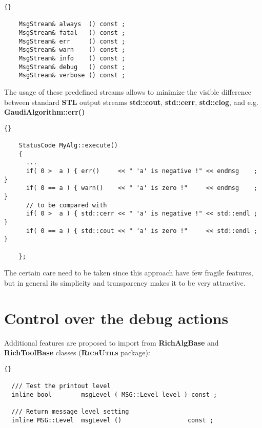 \documentclass{lhcbnote}
\newcommand{\bftt}         {\ttfamily\bfseries}
\newcommand{\scbf}         {\scshape\bfseries}
\begin{document}
\begin{scriptsize}
  \begin{lstlisting}{}

    MsgStream& always  () const ;
    MsgStream& fatal   () const ;
    MsgStream& err     () const ;
    MsgStream& warn    () const ;
    MsgStream& info    () const ;
    MsgStream& debug   () const ;
    MsgStream& verbose () const ;

  \end{lstlisting}
\end{scriptsize}

The usage of these predefined streams 
allows to minimize the visible difference between 
standard {\scbf{STL}} output streams 
{\bftt{std::cout}}, {\bftt{std::cerr}},
{\bftt{std::clog}}, and e.g. {\bftt{GaudiAlgorithm::err()}}

\begin{scriptsize}
 \begin{lstlisting}{}

    StatusCode MyAlg::execute() 
    {
      ...
      if( 0 >  a ) { err()     << " 'a' is negative !" << endmsg    ; }
      if( 0 == a ) { warn()    << " 'a' is zero !"     << endmsg    ; }
      // to be compared with 
      if( 0 >  a ) { std::cerr << " 'a' is negative !" << std::endl ; }
      if( 0 == a ) { std::cout << " 'a' is zero !"     << std::endl ; }

    };

 \end{lstlisting}
\end{scriptsize}

The certain care need to be taken since this approach have 
few fragile features, but in general its simplicity and 
transparency makes it to be very attractive. 

\section{Control over the debug actions}
Additional features are proposed to import from 
{\bftt{RichAlgBase}} and {\bftt{RichToolBase}} classes
({\scbf{RichUtils}} package): 

\begin{scriptsize}
 \begin{lstlisting}{}

  /// Test the printout level
  inline bool        msgLevel ( MSG::Level level ) const ;

  /// Return message level setting
  inline MSG::Level  msgLevel ()                  const ;

 \end{lstlisting}
\end{scriptsize}
\end{document}
